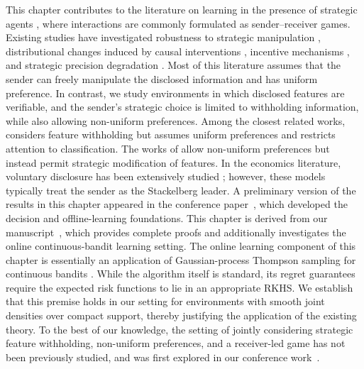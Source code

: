 This chapter contributes to the literature on learning in the presence of strategic agents \cite{bruckner2011stackelberg,hardt2016strategic,dong2018strategic}, where interactions are commonly formulated as sender--receiver games. Existing studies have investigated robustness to strategic manipulation \cite{zhang2015adversarial,chen2018strategyproof}, distributional changes induced by causal interventions \cite{shavit2020causal}, incentive mechanisms \cite{jin2022incentive}, and strategic precision degradation \cite{gast2020linear}. Most of this literature assumes that the sender can freely manipulate the disclosed information and has uniform preference. In contrast, we study environments in which disclosed features are verifiable, and the sender's strategic choice is limited to withholding information, while also allowing non-uniform preferences. Among the closest related works, \cite{krishnaswamy2021classification} considers feature withholding but assumes uniform preferences and restricts attention to classification. The works of \cite{sundaram2023pac,singh2025strategic} allow non-uniform preferences but instead permit strategic modification of features. In the economics literature, voluntary disclosure has been extensively studied \cite{grossman1981informational,milgrom1981good}; however, these models typically treat the sender as the Stackelberg leader. A preliminary version of the results in this chapter appeared in the conference paper~\cite{singh2026linear}, which developed the decision and offline-learning foundations. This chapter is derived from our manuscript~\cite{singh2026revelation_journal}, which provides complete proofs and additionally investigates the online continuous-bandit learning setting. The online learning component of this chapter is essentially an application of Gaussian-process Thompson sampling for continuous bandits \cite{srinivas2010gp,chowdhury2017kernelized,vakili2021information}. While the algorithm itself is standard, its regret guarantees require the expected risk functions to lie in an appropriate RKHS. We establish that this premise holds in our setting for environments with smooth joint densities over compact support, thereby justifying the application of the existing theory. To the best of our knowledge, the setting of jointly considering strategic feature withholding, non-uniform preferences, and a receiver-led game has not been previously studied, and was first explored in our conference work~\cite{singh2026linear}.


